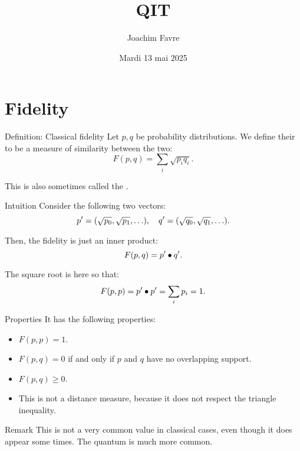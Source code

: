 \documentclass[a4paper]{article}
\title{QIT}
\author{Joachim Favre}
\date{Mardi 13 mai 2025}
\begin{document}
\maketitle


\section{Fidelity}

\begin{parag}{Definition: Classical fidelity}
    Let $p, q$ be probability distributions. We define their  to be a measure of similarity between the two: 
    \[F\left(p, q\right) = \sum_{i} \sqrt{p_i q_i}.\]

    This is also sometimes called the .

    \begin{subparag}{Intuition}
        Consider the following two vectors: 
        \[p' = \left(\sqrt{p_0}, \sqrt{p_1}, \ldots\right), \mathspace q' = \left(\sqrt{q_0}, \sqrt{q_1}, \ldots\right).\]
        
        Then, the fidelity is just an inner product: 
        \[F\left(p, q\right) = p' \dotprod q'.\]

        The square root is here so that: 
        \[F\left(p, p\right) = p' \dotprod p' = \sum_{i} p_i = 1.\]
    \end{subparag}

    \begin{subparag}{Properties}
        It has the following properties:
        \begin{itemize}
            \item $F\left(p, p\right) = 1$.
            \item $F\left(p, q\right) = 0$ if and only if $p$ and $q$ have no overlapping support.
            \item $F\left(p, q\right) \geq 0$.
            \item This is not a distance measure, because it does not respect the triangle inequality.
        \end{itemize}
    \end{subparag}

    \begin{subparag}{Remark}
        This is not a very common value in classical cases, even though it does appear some times. The quantum is much more common.
    \end{subparag}
\end{parag}
\end{document}
